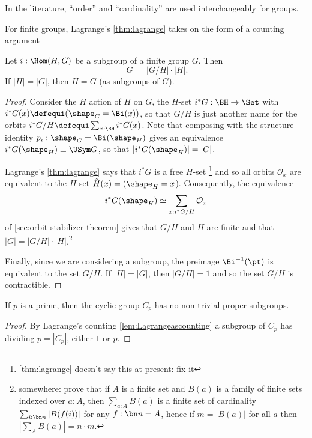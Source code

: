 In the literature, ``order'' and ``cardinality'' are used interchangeably for groups.


For finite groups, Lagrange's \cref{thm:lagrange} takes on the form of a counting argument
\begin{lemma}
  \label{lem:Lagrangeascounting}
  Let $i:\Hom(H,G)$ be a subgroup of a finite group $G$.  Then
$$|G|=|G/H|\cdot|H|.$$
If $|H|=|G|$, then $H=G$ (as subgroups of $G$).
\end{lemma}
\begin{proof}
  Consider the $H$ action of $H$ on $G$, \ie the $H$-set $i^*G:\BH\to\Set$ with $i^*G(x)\defequi(\shape_G=\Bi(x))$, so that $G/H$ is just another name for the orbits $i^*G/H\defequi \sum_{x:\BH}i^*G(x)$.  Note that composing with the structure identity $p_i:\shape_G=\Bi(\shape_H)$ gives an equivalence $i^*G(\shape_H)\equiv \USym G$, so that $|i^*G(\shape_H)|= |G|$.

  Lagrange's \cref{thm:lagrange} says that $i^*G$ is a free $H$-set \footnote{\cref{thm:lagrange} doesn't say this at present: fix it} and so all orbits $\mathcal O_x$ are equivalent to the $H$-set $\tilde H(x)=(\shape_H=x$).
Consequently, the equivalence
$$i^*G(\shape_H)\simeq\sum_{x:i^*G/H}\mathcal O_x$$
of \cref{sec:orbit-stabilizer-theorem} gives that $G/H$ and $H$ are finite and that $|G|=|G/H|\cdot|H|$.\footnote{somewhere: prove that if $A$ is a finite set and $B(a)$ is a family of finite sets indexed over $a:A$, then $\sum_{a:A}B(a)$ is a finite set of cardinality $\sum_{i:\bn n}|B(f(i))|$ for any $f:\bn n=A$, hence if $m=|B(a)|$ for all $a$ then $|\sum_AB(a)|=n\cdot m$.}


Finally, since we are considering a subgroup, the preimage $\Bi^{-1}(\pt)$ is equivalent to the set $G/H$.  If $|H|=|G|$, then $|G/H|=1$ and so the set $G/H$ is contractible.\end{proof}


    \begin{corollary}
      \label{cor:cyclicgroupsaresimple}
      If $p$ is a prime, then  the cyclic group $C_p$ has no non-trivial proper subgroups.
    \end{corollary}
    \begin{proof}
      By Lagrange's counting \cref{lem:Lagrangeascounting} a subgroup of $C_p$ has \gporder dividing $p=|C_p|$, \ie either $1$ or $p$.
    \end{proof}

